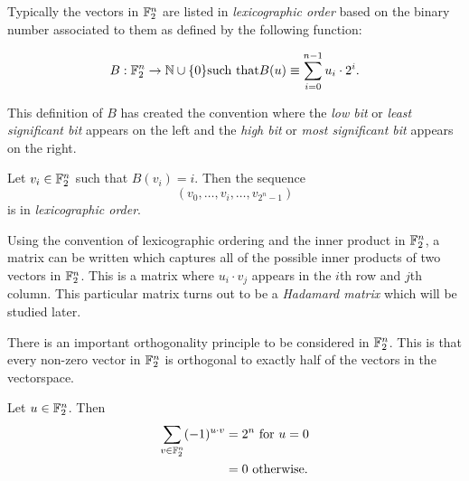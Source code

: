 \par Typically the vectors in $\mathbb{F}_2^n$ are listed in {\em lexicographic order} based on
the binary number associated to them as defined by the following function:

\begin{equation}
	B:\mathbb{F}_2^n\rightarrow\mathbb{N}\cup\{0\} {\rm such\ that } B(u)\equiv \sum_{i=0}^{n-1}u_i\cdot2^i.
\end{equation}

\par This definition of $B$ has created the convention where the {\em low bit} or
{\em least significant bit} appears on the left and the {\em high bit} or {\em most significant bit}
appears on the right.

\begin{definition}
\label{def:lex-order}
	Let $v_i\in\mathbb{F}_2^n$ such that $B(v_i)=i$. Then the sequence
	\[
		(v_0,\dots,v_i,\dots,v_{2^n-1})
	\]
	is in {\em lexicographic order}.
\end{definition}

\par Using the convention of lexicographic ordering and the inner product in $\mathbb{F}_2^n$, a
matrix can be written which captures all of the possible inner products of two vectors in
$\mathbb{F}_2^n$. This is a matrix where $u_i\cdot v_j$ appears in the $i$th row and $j$th column.
This particular matrix turns out to be a {\em Hadamard matrix} which will be studied later.

\par There is an important orthogonality principle to be considered in $\mathbb{F}_2^n$. This is that
every non-zero vector in $\mathbb{F}_2^n$ is orthogonal to exactly half of the vectors in the vectorspace.

\begin{theorem}
	\label{thm:orthogonality-principle}
	Let $u\in\mathbb{F}_2^n$. Then
	\begin{align}
		\sum_{v\in\mathbb{F}_2^n}(-1)^{u\cdot v} &= 2^n {\rm \ for\ } u=0 \\
		                                   &= 0 {\rm \ otherwise.}
  \end{align}
\end{theorem}

